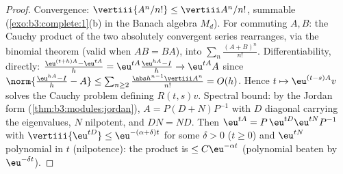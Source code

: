 \begin{proof}
Convergence: $\vertiii{A^n/n!} \leq \vertiii A^n/n!$, summable
(\cref{exo:b3:complete:1}(b) in the Banach algebra
$M_d$). For commuting $A, B$: the Cauchy product of the two
absolutely convergent series rearranges, via the binomial
theorem (valid when $AB = BA$), into
$\sum_n\frac{(A+B)^n}{n!}$. Differentiability, directly:
$\frac{\eu^{(t+h)A} - \eu^{tA}}h = \eu^{tA}\frac{\eu^{hA} -
I}{h} \to \eu^{tA}A$ since $\norm{\frac{\eu^{hA} - I}h - A}
\leq \sum_{n\geq2}\frac{\abs h^{n-1}\vertiii A^n}{n!} =
O(h)$. Hence $t \mapsto \eu^{(t - s)A}v$ solves the Cauchy
problem defining $R(t,s)v$. Spectral bound: by the Jordan form
(\cref{thm:b3:modules:jordan}), $A = P(D + N)P^{-1}$ with $D$
diagonal carrying the eigenvalues, $N$ nilpotent, and $DN =
ND$. Then $\eu^{tA} = P\,\eu^{tD}\eu^{tN}P^{-1}$ with
$\vertiii{\eu^{tD}} \leq \eu^{-(\alpha + \delta)t}$ for some
$\delta > 0$ ($t \geq 0$) and $\eu^{tN}$ polynomial in $t$
(nilpotence): the product is $\leq C\eu^{-\alpha t}$
(polynomial beaten by $\eu^{-\delta t}$).
\end{proof}

